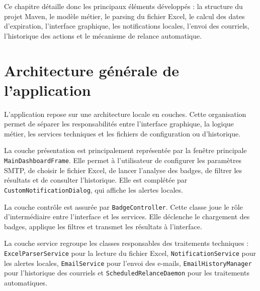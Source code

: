 \documentclass[12pt,a4paper,openany]{report}
\begin{document}
Ce chapitre détaille donc les principaux éléments développés : la structure du
projet Maven, le modèle métier, le parsing du fichier Excel, le calcul des dates
d'expiration, l'interface graphique, les notifications locales, l'envoi des
courriels, l'historique des actions et le mécanisme de relance automatique.

\section{Architecture générale de l'application}

L'application repose sur une architecture locale en couches. Cette organisation
permet de séparer les responsabilités entre l'interface graphique, la logique
métier, les services techniques et les fichiers de configuration ou d'historique.

La couche présentation est principalement représentée par la fenêtre principale
\texttt{MainDashboardFrame}. Elle permet à l'utilisateur de configurer les
paramètres SMTP, de choisir le fichier Excel, de lancer l'analyse des badges, de
filtrer les résultats et de consulter l'historique. Elle est complétée par
\texttt{CustomNotificationDialog}, qui affiche les alertes locales.

La couche contrôle est assurée par \texttt{BadgeController}. Cette classe joue le
rôle d'intermédiaire entre l'interface et les services. Elle déclenche le
chargement des badges, applique les filtres et transmet les résultats à
l'interface.

La couche service regroupe les classes responsables des traitements techniques :
\texttt{ExcelParserService} pour la lecture du fichier Excel,
\texttt{NotificationService} pour les alertes locales, \texttt{EmailService} pour
l'envoi des e-mails, \texttt{EmailHistoryManager} pour l'historique des courriels
et \texttt{ScheduledRelanceDaemon} pour les traitements automatiques.
\end{document}
